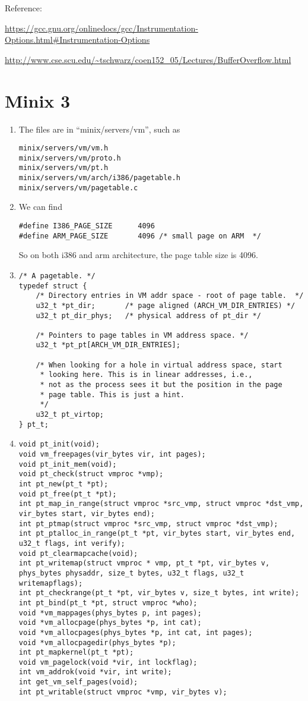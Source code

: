 \documentclass{article}
\begin{document}
Reference: 

\url{https://gcc.gnu.org/onlinedocs/gcc/Instrumentation-Options.html#Instrumentation-Options}

\url{http://www.cse.scu.edu/~tschwarz/coen152_05/Lectures/BufferOverflow.html}

\section{Minix 3}
\begin{enumerate}
\item
The files are in ``minix/servers/vm'', such as
\begin{verbatim}
minix/servers/vm/vm.h
minix/servers/vm/proto.h
minix/servers/vm/pt.h
minix/servers/vm/arch/i386/pagetable.h
minix/servers/vm/pagetable.c
\end{verbatim}
\item
We can find
\begin{verbatim}
#define I386_PAGE_SIZE		4096
#define ARM_PAGE_SIZE		4096 /* small page on ARM  */
\end{verbatim}
So on both i386 and arm architecture, the page table size is 4096.
\item
\begin{verbatim}
/* A pagetable. */
typedef struct {
    /* Directory entries in VM addr space - root of page table.  */
    u32_t *pt_dir;       /* page aligned (ARCH_VM_DIR_ENTRIES) */
    u32_t pt_dir_phys;   /* physical address of pt_dir */

    /* Pointers to page tables in VM address space. */
    u32_t *pt_pt[ARCH_VM_DIR_ENTRIES];

    /* When looking for a hole in virtual address space, start
     * looking here. This is in linear addresses, i.e.,
     * not as the process sees it but the position in the page
     * page table. This is just a hint.
     */
    u32_t pt_virtop;
} pt_t;
\end{verbatim}
\item
\begin{verbatim}
void pt_init(void);
void vm_freepages(vir_bytes vir, int pages);
void pt_init_mem(void);
void pt_check(struct vmproc *vmp);
int pt_new(pt_t *pt);
void pt_free(pt_t *pt);
int pt_map_in_range(struct vmproc *src_vmp, struct vmproc *dst_vmp, vir_bytes start, vir_bytes end);
int pt_ptmap(struct vmproc *src_vmp, struct vmproc *dst_vmp);
int pt_ptalloc_in_range(pt_t *pt, vir_bytes start, vir_bytes end, u32_t flags, int verify);
void pt_clearmapcache(void);
int pt_writemap(struct vmproc * vmp, pt_t *pt, vir_bytes v, phys_bytes physaddr, size_t bytes, u32_t flags, u32_t writemapflags);
int pt_checkrange(pt_t *pt, vir_bytes v, size_t bytes, int write);
int pt_bind(pt_t *pt, struct vmproc *who);
void *vm_mappages(phys_bytes p, int pages);
void *vm_allocpage(phys_bytes *p, int cat);
void *vm_allocpages(phys_bytes *p, int cat, int pages);
void *vm_allocpagedir(phys_bytes *p);
int pt_mapkernel(pt_t *pt);
void vm_pagelock(void *vir, int lockflag);
int vm_addrok(void *vir, int write);
int get_vm_self_pages(void);
int pt_writable(struct vmproc *vmp, vir_bytes v);
\end{verbatim}
\end{enumerate}
\end{document}
